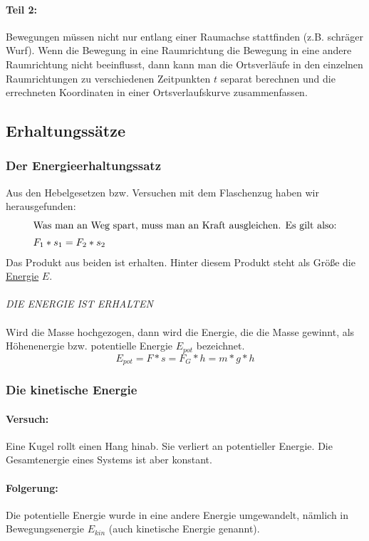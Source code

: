 \documentclass[12pt]{article}
\numberwithin{equation}{subsection}
\begin{document}
	\paragraph{Teil 2:}
	Bewegungen müssen nicht nur entlang einer Raumachse stattfinden (z.B. schräger Wurf). Wenn die Bewegung in eine Raumrichtung die Bewegung in eine andere Raumrichtung nicht beeinflusst, dann kann man die Ortsverläufe in den einzelnen Raumrichtungen zu verschiedenen Zeitpunkten $ t $ separat berechnen und die errechneten Koordinaten in einer Ortsverlaufskurve zusammenfassen.
	
	\subsection{Erhaltungssätze}
	\subsubsection{Der Energieerhaltungssatz}
	Aus den Hebelgesetzen bzw. Versuchen mit dem Flaschenzug haben wir herausgefunden:
	\begin{align}
		\intertext{Was man an Weg spart, muss man an Kraft ausgleichen. Es gilt also:}
		F_1*s_1=F_2*s_2
	\end{align}
	Das Produkt aus beiden ist erhalten. Hinter diesem Produkt steht als Größe die \underline{Energie} $ E $.\\\\
	\emph{DIE ENERGIE IST ERHALTEN}\\\\
	Wird die Masse hochgezogen, dann wird die Energie, die die Masse gewinnt, als Höhenenergie bzw. potentielle Energie $ E_{pot} $ bezeichnet.
	\begin{equation}
		E_{pot} = F*s = F_G*h = m*g*h
	\end{equation}
	
	\subsubsection{Die kinetische Energie}
	\paragraph{Versuch:}
	Eine Kugel rollt einen Hang hinab. Sie verliert an potentieller Energie. Die Gesamtenergie eines Systems ist aber konstant.
	\paragraph{Folgerung:}
	Die potentielle Energie wurde in eine andere Energie umgewandelt, nämlich in Bewegungsenergie $ E_{kin} $ (auch kinetische Energie genannt).
\end{document}
